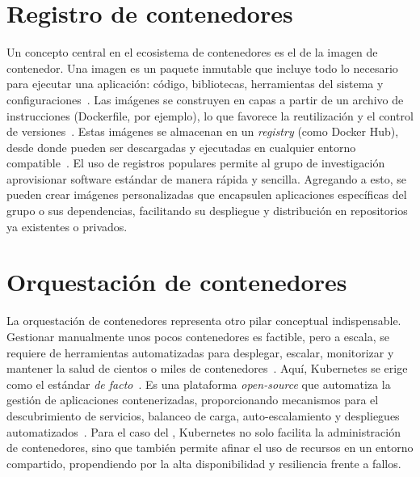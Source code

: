\section{Registro de contenedores}
\noindent
Un concepto central en el ecosistema de contenedores es el de la imagen de contenedor. Una imagen es un paquete inmutable que incluye todo lo necesario para ejecutar una aplicación: código, bibliotecas, herramientas del sistema y configuraciones~\citep{straesser2023empirical}. Las imágenes se construyen en capas a partir de un archivo de instrucciones (Dockerfile, por ejemplo), lo que favorece la reutilización y el control de versiones~\citep{dahlmanns2023secrets}. Estas imágenes se almacenan en un \textit{registry} (como Docker Hub), desde donde pueden ser descargadas y ejecutadas en cualquier entorno compatible~\citep{anwar2018improving}. El uso de registros populares permite al grupo de investigación aprovisionar software estándar de manera rápida y sencilla. Agregando a esto, se pueden crear imágenes personalizadas que encapsulen aplicaciones específicas del grupo o sus dependencias, facilitando su despliegue y distribución en repositorios ya existentes o privados.

\section{Orquestación de contenedores}
\noindent
La orquestación de contenedores representa otro pilar conceptual indispensable. Gestionar manualmente unos pocos contenedores es factible, pero a escala, se requiere de herramientas automatizadas para desplegar, escalar, monitorizar y mantener la salud de cientos o miles de contenedores~\citep{al2019container}. Aquí, Kubernetes se erige como el estándar \textit{de facto}~\citep{zhou2021container}. Es una plataforma \textit{open-source} que automatiza la gestión de aplicaciones contenerizadas, proporcionando mecanismos para el descubrimiento de servicios, balanceo de carga, auto-escalamiento y despliegues automatizados~\citep{carrion2022kubernetes}. Para el caso del \GRID, Kubernetes no solo facilita la administración de contenedores, sino que también permite afinar el uso de recursos en un entorno compartido, propendiendo por la alta disponibilidad y resiliencia frente a fallos.

